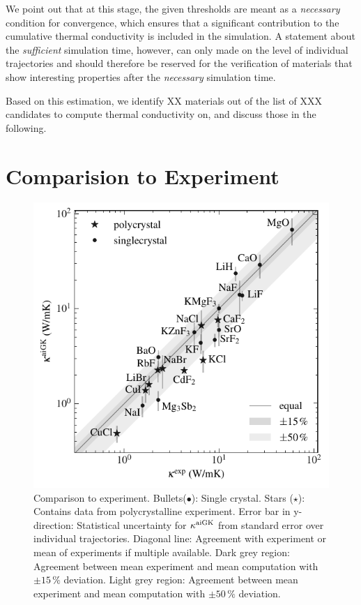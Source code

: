 %
We point out that at this stage, the given thresholds are meant as a \emph{necessary} condition for convergence, which ensures that a significant contribution to the cumulative thermal conductivity is included in the simulation. A statement about the \emph{sufficient} simulation time, however, can only made on the level of individual trajectories and should therefore be reserved for the verification of materials that show interesting properties after the \emph{necessary} simulation time.

Based on this estimation, we identify XX materials out of the list of XXX candidates to compute thermal conductivity on, and discuss those in the following.


\section{Comparision to Experiment}



\begin{figure}
	\includegraphics[width=\textwidth]{./data/plots/kappa_vs_exp_trusted/kappa_vs_exp_corrected_annotated.pdf}
	\caption{Comparison to experiment. Bullets($\bullet$): Single crystal. Stars ($\star$): Contains data from polycrystalline experiment. Error bar in y-direction: Statistical uncertainty for $\kappa^{\rm aiGK}$ from standard error over individual trajectories. Diagonal line: Agreement with experiment or mean of experiments if multiple available. Dark grey region: Agreement between mean experiment and mean computation with $\pm 15\,\%$ deviation. Light grey region: Agreement between mean experiment and mean computation with $\pm 50\,\%$ deviation.}
	\label{fig:kappa_exp}
\end{figure}



